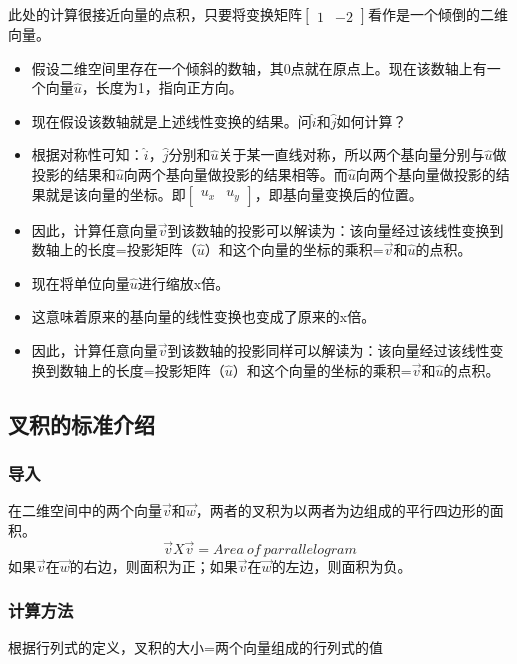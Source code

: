\documentclass[UTF8]{ctexart}
\begin{document}
此处的计算很接近向量的点积，只要将变换矩阵$\begin{bmatrix}
	1 & -2
\end{bmatrix}$看作是一个倾倒的二维向量。
\begin{itemize}
	\item 假设二维空间里存在一个倾斜的数轴，其0点就在原点上。现在该数轴上有一个向量$\hat{u}$，长度为1，指向正方向。
	\item 现在假设该数轴就是上述线性变换的结果。问$\hat{i}$和$\hat{j}$如何计算？
	\item 根据对称性可知：$\hat{i}$，$\hat{j}$分别和$\hat{u}$关于某一直线对称，所以两个基向量分别与$\hat{u}$做投影的结果和$\hat{u}$向两个基向量做投影的结果相等。而$\hat{u}$向两个基向量做投影的结果就是该向量的坐标。即$\begin{bmatrix}
		u_x & u_y
	\end{bmatrix}$，即基向量变换后的位置。
	\item 因此，计算任意向量$\overrightarrow{v}$到该数轴的投影可以解读为：该向量经过该线性变换到数轴上的长度=投影矩阵（$\hat{u}$）和这个向量的坐标的乘积=$\overrightarrow{v}$和$\hat{u}$的点积。
	\item 现在将单位向量$\hat{u}$进行缩放x倍。
	\item 这意味着原来的基向量的线性变换也变成了原来的x倍。
	\item 因此，计算任意向量$\overrightarrow{v}$到该数轴的投影同样可以解读为：该向量经过该线性变换到数轴上的长度=投影矩阵（$\hat{u}$）和这个向量的坐标的乘积=$\overrightarrow{v}$和$\hat{u}$的点积。
\end{itemize}

\subsection{叉积的标准介绍}
\subsubsection{导入}
在二维空间中的两个向量$\overrightarrow{v}$和$\overrightarrow{w}$，两者的叉积为以两者为边组成的平行四边形的面积。
$$\overrightarrow{v} X \overrightarrow{v} = Area\ of\ parrallelogram$$
如果$\overrightarrow{v}$在$\overrightarrow{w}$的右边，则面积为正；如果$\overrightarrow{v}$在$\overrightarrow{w}$的左边，则面积为负。
\subsubsection{计算方法}
根据行列式的定义，叉积的大小=两个向量组成的行列式的值
\end{document}
